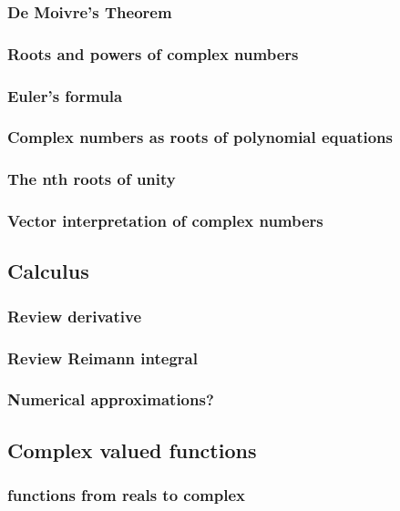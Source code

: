 \documentclass{article}
\begin{document}
\subsubsection{De Moivre's Theorem}
\label{sec:orgce2cde3}
\subsubsection{Roots and powers of complex numbers}
\label{sec:org0ab406e}
\subsubsection{Euler's formula}
\label{sec:org7ce5b37}
\subsubsection{Complex numbers as roots of polynomial equations}
\label{sec:org1629118}
\subsubsection{The nth roots of unity}
\label{sec:org8167f39}
\subsubsection{Vector interpretation of complex numbers}
\label{sec:orgde10624}
\subsection{Calculus}
\label{sec:org9c415fd}
\subsubsection{Review derivative}
\label{sec:orgb99c230}
\subsubsection{Review Reimann integral}
\label{sec:orgb10ba43}
\subsubsection{Numerical approximations?}
\label{sec:org9b48ed3}
\subsection{Complex valued functions}
\label{sec:org2b5135d}
\subsubsection{functions from reals to complex}
\label{sec:org3e123c2}
\end{document}
